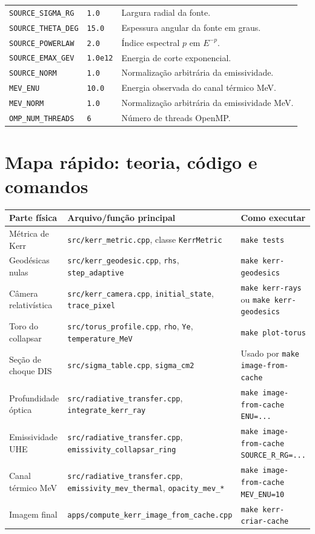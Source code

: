 \documentclass[11pt,a4paper]{article}
\begin{document}
\begin{longtable}{llp{7.3cm}}
\texttt{SOURCE\_SIGMA\_RG} & \texttt{1.0} & Largura radial da fonte.\\
\texttt{SOURCE\_THETA\_DEG} & \texttt{15.0} & Espessura angular da fonte em graus.\\
\texttt{SOURCE\_POWERLAW} & \texttt{2.0} & Índice espectral $p$ em $E^{-p}$.\\
\texttt{SOURCE\_EMAX\_GEV} & \texttt{1.0e12} & Energia de corte exponencial.\\
\texttt{SOURCE\_NORM} & \texttt{1.0} & Normalização arbitrária da emissividade.\\
\texttt{MEV\_ENU} & \texttt{10.0} & Energia observada do canal térmico MeV.\\
\texttt{MEV\_NORM} & \texttt{1.0} & Normalização arbitrária da emissividade MeV.\\
\texttt{OMP\_NUM\_THREADS} & \texttt{6} & Número de threads OpenMP.\\
\bottomrule
\end{longtable}

\section{Mapa rápido: teoria, código e comandos}

\begingroup
\small
\begin{longtable}{p{3.2cm}p{6.2cm}p{4.8cm}}
\toprule
Parte física & Arquivo/função principal & Como executar\\
\midrule
\endhead
Métrica de Kerr &
\texttt{src/kerr\_metric.cpp}, classe \texttt{KerrMetric} &
\texttt{make tests}\\
Geodésicas nulas &
\texttt{src/kerr\_geodesic.cpp}, \texttt{rhs}, \texttt{step\_adaptive} &
\texttt{make kerr-geodesics}\\
Câmera relativística &
\texttt{src/kerr\_camera.cpp}, \texttt{initial\_state}, \texttt{trace\_pixel} &
\texttt{make kerr-rays} ou \texttt{make kerr-geodesics}\\
Toro do collapsar &
\texttt{src/torus\_profile.cpp}, \texttt{rho}, \texttt{Ye}, \texttt{temperature\_MeV} &
\texttt{make plot-torus}\\
Seção de choque DIS &
\texttt{src/sigma\_table.cpp}, \texttt{sigma\_cm2} &
Usado por \texttt{make image-from-cache}\\
Profundidade óptica &
\texttt{src/radiative\_transfer.cpp}, \texttt{integrate\_kerr\_ray} &
\texttt{make image-from-cache ENU=...}\\
Emissividade UHE &
\texttt{src/radiative\_transfer.cpp}, \texttt{emissivity\_collapsar\_ring} &
\texttt{make image-from-cache SOURCE\_R\_RG=...}\\
Canal térmico MeV &
\texttt{src/radiative\_transfer.cpp}, \texttt{emissivity\_mev\_thermal},
\texttt{opacity\_mev\_*} &
\texttt{make image-from-cache MEV\_ENU=10}\\
Imagem final &
\texttt{apps/compute\_kerr\_image\_from\_cache.cpp} &
\texttt{make kerr-criar-cache}\\
\bottomrule
\end{longtable}
\endgroup
\end{document}
